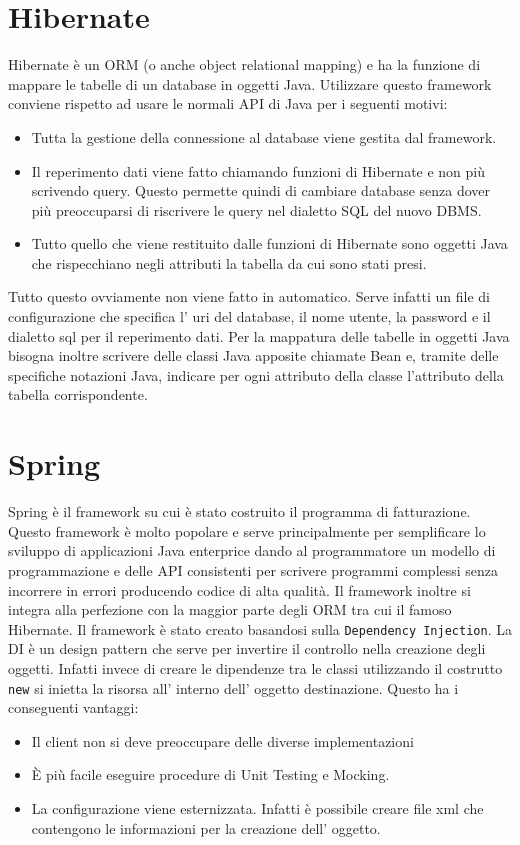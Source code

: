 \documentclass[12pt]{book}
\begin{document}
\section{Hibernate}
Hibernate è un ORM (o anche object relational mapping) e ha la funzione di 
mappare le tabelle di un database in oggetti Java.
Utilizzare questo framework conviene rispetto ad usare le normali API di Java
per i seguenti motivi:
\begin{itemize}
    \item Tutta la gestione della connessione al database viene gestita dal 
        framework.
    \item Il reperimento dati viene fatto chiamando funzioni di Hibernate e non
        più scrivendo query. Questo permette quindi di cambiare database senza
        dover più preoccuparsi di riscrivere le query nel dialetto SQL del 
        nuovo DBMS\@.
    \item Tutto quello che viene restituito dalle funzioni di Hibernate sono
        oggetti Java che rispecchiano negli attributi la tabella da cui sono
        stati presi.
\end{itemize}
Tutto questo ovviamente non viene fatto in automatico.
Serve infatti un file di configurazione che specifica l' uri del database,
il nome utente, la password e il dialetto sql per il reperimento dati.
Per la mappatura delle tabelle in oggetti Java bisogna inoltre scrivere delle
classi Java apposite chiamate Bean e, tramite delle specifiche notazioni Java, 
indicare per ogni attributo della classe l'attributo della tabella 
corrispondente.
\section{Spring}
Spring è il framework su cui è stato costruito il programma di 
fatturazione.
Questo framework è molto popolare e serve principalmente per semplificare lo 
sviluppo di applicazioni Java enterprice dando al programmatore un modello di 
programmazione e delle API consistenti per scrivere programmi complessi senza 
incorrere in errori producendo codice di alta qualità.
Il framework inoltre si integra alla perfezione con la maggior parte degli ORM
tra cui il famoso Hibernate.
Il framework è stato creato basandosi sulla \texttt{Dependency Injection}.
La DI è un design pattern che serve per invertire il controllo nella creazione
degli oggetti.
Infatti invece di creare le dipendenze tra le classi utilizzando il costrutto
\texttt{new} si inietta la risorsa all' interno dell' oggetto destinazione.
Questo ha i conseguenti vantaggi:
\begin{itemize}
    \item Il client non si deve preoccupare delle diverse implementazioni
    \item È più facile eseguire procedure di Unit Testing e Mocking.
    \item La configurazione viene esternizzata. Infatti è possibile creare 
        file xml che contengono le informazioni per la creazione dell' oggetto.
\end{itemize}
\end{document}
